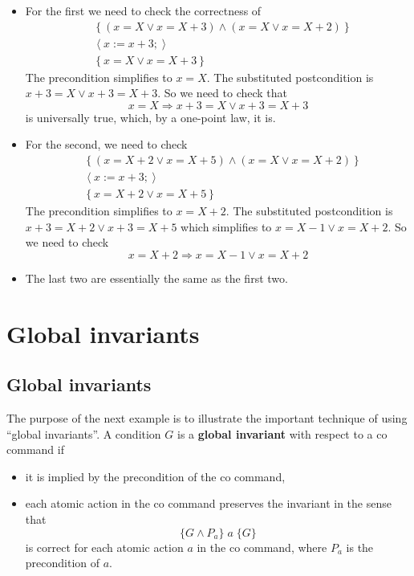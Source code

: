 \documentclass[11pt]{article}%
\begin{document}
\begin{itemize}
\begin{itemize}
\item For the first we need to check the correctness of%
\begin{align*}
&  \left\{  \left(  x=X\vee x=X+3\right)  \wedge\left(  x=X\vee x=X+2\right)
\right\} \\
&  \left\langle x:=x+3;\right\rangle \\
&  \left\{  x=X\vee x=X+3\right\}
\end{align*}
The precondition simplifies to $x=X$. The substituted postcondition is
$x+3=X\vee x+3=X+3$. So we need to check that%
\[
x=X\Rightarrow x+3=X\vee x+3=X+3
\]
is universally true, which, by a one-point law, it is.

\item For the second, we need to check%
\begin{align*}
&  \left\{  \left(  x=X+2\vee x=X+5\right)  \wedge\left(  x=X\vee
x=X+2\right)  \right\} \\
&  \left\langle x:=x+3;\right\rangle \\
&  \left\{  x=X+2\vee x=X+5\right\}
\end{align*}
The precondition simplifies to $x=X+2$. The substituted postcondition is
$x+3=X+2\vee x+3=X+5$ which simplifies to $x=X-1\vee x=X+2$. So we need to
check%
\[
x=X+2\Rightarrow x=X-1\vee x=X+2
\]


\item The last two are essentially the same as the first two.
\end{itemize}
\end{itemize}

\section{Global invariants\label{global}}

\subsection{Global invariants}

The purpose of the next example is to illustrate the important technique of
using \textquotedblleft global invariants\textquotedblright. A condition $G$
is a \textbf{global invariant} with respect to a co command if

\begin{itemize}
\item it is implied by the precondition of the co command,

\item each atomic action in the co command preserves the invariant in the
sense that%
\[
\{G\wedge P_{a}\}\;a\;\{G\}
\]
is correct for each atomic action $a$ in the co command, where $P_{a}$ is the
precondition of $a$.
\end{itemize}
\end{document}
